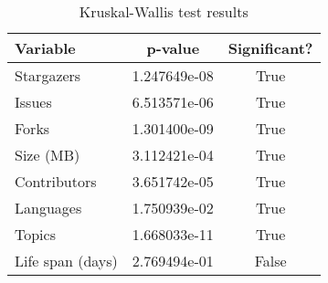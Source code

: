 \begin{table}
\centering
\caption{Kruskal-Wallis test results}
\label{tab:kruskal_wallis}
\begin{tabular}{lcc}
\toprule
        Variable &      p-value &  Significant? \\
\midrule
      Stargazers & 1.247649e-08 &          True \\
          Issues & 6.513571e-06 &          True \\
           Forks & 1.301400e-09 &          True \\
       Size (MB) & 3.112421e-04 &          True \\
    Contributors & 3.651742e-05 &          True \\
       Languages & 1.750939e-02 &          True \\
          Topics & 1.668033e-11 &          True \\
Life span (days) & 2.769494e-01 &         False \\
\bottomrule
\end{tabular}
\end{table}
